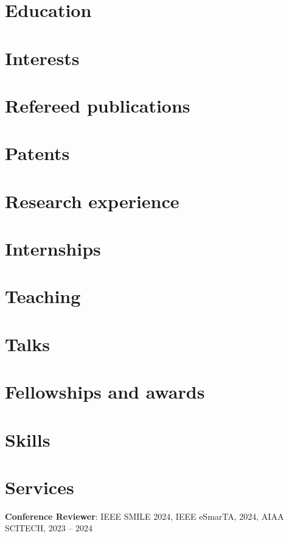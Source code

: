 \documentclass[10pt]{article}
\begin{document}



\section{{Education}}



\section{Interests}



\section{Refereed publications}



\section{Patents}



\section{Research experience}



\section{Internships}



\section{Teaching}



\section{Talks}



\section{Fellowships and awards}



\section{Skills}



\section{Services}
\textbf{Conference Reviewer}: IEEE SMILE 2024, IEEE eSmarTA, 2024, AIAA SCITECH, 2023 – 2024
\end{document}
